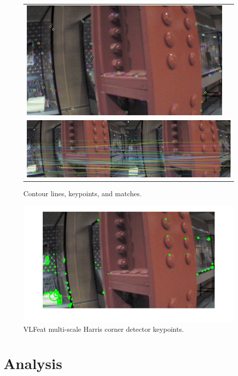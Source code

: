 \documentclass{acmsiggraph}
\begin{document}
\begin{figure}[h]
\begin{tabular}{cc}
    \includegraphics[resolution=150, scale=0.75]{images/contour-kp2} \\
    \multicolumn{2}{c}{\includegraphics[resolution=150, scale=0.75]{images/contour-matches}}
  \end{tabular}
  \caption{Contour lines, keypoints, and matches.}
  \label{fig:contour-ex}
\end{figure}

\begin{figure}[h]
  \centering
  \includegraphics[resolution=150, scale=0.75]{images/vlfeat-kp2}
  \caption{VLFeat multi-scale Harris corner detector keypoints.}
  \label{fig:vlfeat-ex}
\end{figure}

\section{Analysis}
\end{document}
